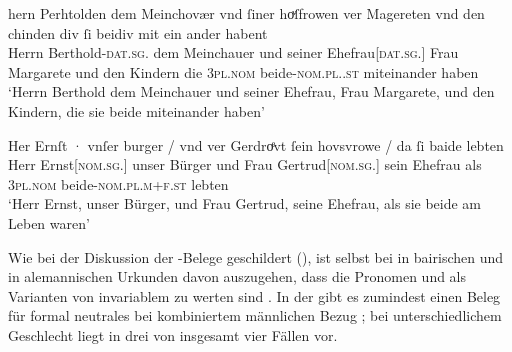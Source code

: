 \begin{exe}
\ex \label{ex:m+f_si_beide_iu}
	\begin{xlist}
	\ex \label{ex:m+f_si_beidiu}
		\gll hern Perhtolden dem Meinchovær vnd ſiner hoͮſfrowen ver Magereten
				vnd den chinden div ſi beidiv {mit ein ander} habent \\
			Herrn Berthold-\textsc{dat.sg.\MascM} dem Meinchauer und seiner
				Ehefrau[\textsc{dat.sg.\FemF}] Frau Margarete und den Kindern
				die \textsc{3pl\subMF.nom} beide-\textsc{nom.pl.\NeutMF.st}
				miteinander haben \\
		\trans `Herrn Berthold dem Meinchauer und seiner Ehefrau, Frau
			Margarete, und den Kindern, die sie beide miteinander haben'
			\parencites(Nr.~937, Regensburg, 1287)[292,40--41]{cao2}

	\ex \label{ex:m+f_si_beide}
		\gll Her Ernſt · vnſer burger / vnd ver Gerdroͤvt ſein hovsvrowe / da
				ſi baide lebten \\
			Herr Ernst[\textsc{nom.sg.\MascM}] {} unser Bürger {} und Frau
				Gertrud[\textsc{nom.sg.\FemF}] sein Ehefrau {} als
				\textsc{3pl\subMF.nom} beide-\textsc{nom.pl.m+f\subMF.st}
				lebten \\
		\trans `Herr Ernst, unser Bürger, und Frau Gertrud, seine Ehefrau,
			als sie beide am Leben waren'
			\parencites(Nr.~1073, Wien, 1289)[374,40--41]{cao2}
	\end{xlist}
\end{exe}

Wie bei der Diskussion der \CAO{}-Belege geschildert
(), ist selbst bei
 in bairischen und 
in alemannischen Urkunden davon auszugehen, dass die Pronomen
 und  als Varianten von invariablem  zu werten
sind \autocite[394--396]{ksw2}. In der \KC{} gibt es zumindest einen Beleg für
formal neutrales  bei kombiniertem männlichen Bezug
; bei unterschiedlichem Geschlecht liegt
 in drei von insgesamt vier Fällen vor.

